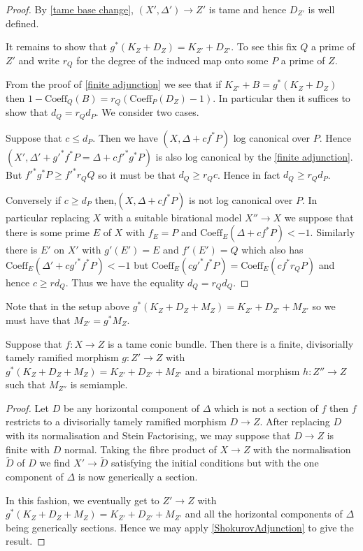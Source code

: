 \begin{proof}
	By \autoref{tame base change}, $(X',\Delta') \to Z'$ is tame and hence $D_{Z'}$ is well defined.
	
	It remains to show that $g^{*}(K_{Z}+D_{Z})=K_{Z'}+D_{Z'}$. To see this fix $Q$ a prime of $Z'$ and write $r_{Q}$ for the degree of the induced map onto some $P$ a prime of $Z$. 
	
	From the proof of \autoref{finite adjunction} we see that if $K_{Z'}+B=g^{*}(K_{Z}+D_{Z})$ then $1-\text{Coeff}_{Q}(B)=r_{Q}(\text{Coeff}_{P}(D_{Z})-1)$. In particular then it suffices to show that $d_{Q}=r_{Q}d_{P}$. We consider two cases.
	
	Suppose that $c \leq d_{P}$. Then we have $(X,\Delta+cf^{*}P)$ log canonical over $P$. Hence $(X',\Delta'+g'^{*}f^{*}P=\Delta+cf'^{*}g^{*}P)$ is also log canonical by the \autoref{finite adjunction}. But $f'^{*}g^{*}P \geq f'^{*}r_{Q}Q$ so it must be that $d_{Q} \geq r_{Q}c$. Hence in fact $d_{Q} \geq r_{Q}d_{P}$.
	
	Conversely if $c \geq d_{P}$ then,$(X,\Delta+cf^{*}P)$ is not log canonical over $P$. In particular replacing $X$ with a suitable birational model $X'' \to X$ we suppose that there is some prime $E$ of $X$ with $f_{E}=P$ and $\text{Coeff}_{E}(\Delta+cf^{*}P) < -1$. Similarly there is $E'$ on $X'$ with $g'(E')=E$ and $f'(E')=Q$ which also has $\text{Coeff}_{E}(\Delta'+cg'^{*}f^{*}P) < -1$ but $\text{Coeff}_{E}(cg'^{*}f^{*}P)=\text{Coeff}_{E}(cf^{*}r_{Q}P)$ and hence $c \geq rd_{Q}$. Thus we have the equality $d_{Q}=r_{Q}d_{Q}$.
\end{proof}


Note that in the setup above $g^{*}(K_{Z}+D_{Z}+M_{Z})=K_{Z'}+D_{Z'}+M_{Z'}$ so we must have that $M_{Z'}=g^{*}M_{Z}$.

\begin{lemma}
	Suppose that $f\colon X \to Z$ is a tame conic bundle. Then there is a finite, divisorially tamely ramified morphism $g\colon Z' \to Z$ with $g^{*}(K_{Z}+D_{Z}+M_{Z})=K_{Z'}+D_{Z'}+M_{Z'}$ and a birational morphism $h\colon Z'' \to Z$ such that $M_{Z''}$ is semiample.
\end{lemma}
\begin{proof}
	Let $D$ be any horizontal component of $\Delta$ which is not a section of $f$ then $f$ restricts to a divisorially tamely ramified morphism $D \to Z$. After replacing $D$ with its normalisation and Stein Factorising, we may suppose that $D\to Z$ is finite with $D$ normal. Taking the fibre product of $X \to Z$ with the normalisation $\tilde{D}$ of $D$ we find $X' \to \tilde{D}$ satisfying the initial conditions but with the one component of $\Delta$ is now  generically a section.
	
	In this fashion, we eventually get to $Z' \to Z$ with $g^{*}(K_{Z}+D_{Z}+M_{Z})=K_{Z'}+D_{Z'}+M_{Z'}$ and all the horizontal components of $\Delta$ being generically sections. Hence we may apply \autoref{ShokurovAdjunction} to give the result.
\end{proof}

